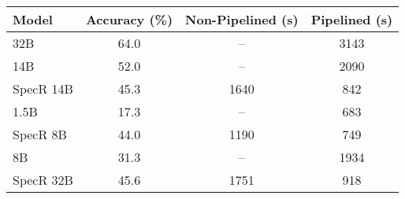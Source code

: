 \begin{tabular}{lccc}
\toprule
Model & Accuracy (\%) & Non-Pipelined (s) & Pipelined (s)\\
\midrule
32B & 64.0 & – & 3143\\
14B & 52.0 & – & 2090\\
SpecR 14B & 45.3 & 1640 & 842\\
1.5B & 17.3 & – & 683\\
SpecR 8B & 44.0 & 1190 & 749\\
8B & 31.3 & – & 1934\\
SpecR 32B & 45.6 & 1751 & 918\\
\bottomrule
\end{tabular}